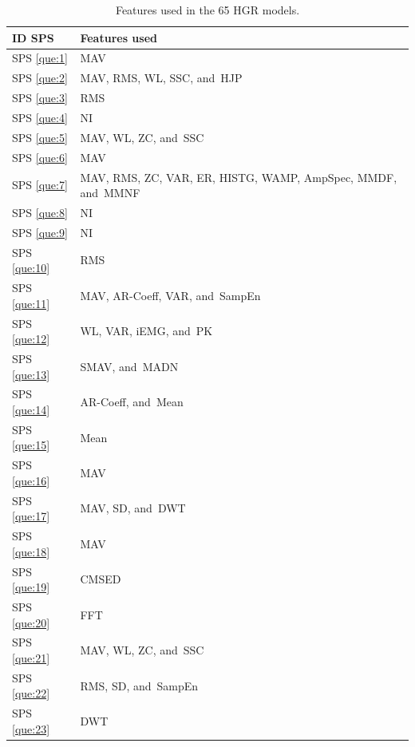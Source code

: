 \documentclass[sensors,review,accept,moreauthors,pdftex]{Definitions/mdpi}
\begin{document}
\begin{table}[H]
\centering
	\caption{ Features used in the 65 HGR models.} \label{tab:10}
\begin{tabular}{m{33pt}m{370pt}}
	\toprule
	\textbf{ID SPS}&\textbf{Features used}\\
	\midrule
%	
%	
%	
%	
%	
%	
	
	SPS \ref{que:1}	&	MAV	\\	
	SPS \ref{que:2}	&	MAV, RMS, WL, SSC, and~HJP	\\	
	SPS \ref{que:3}	&	RMS	\\	
	SPS \ref{que:4}	&	NI	\\	
	SPS \ref{que:5}	&	MAV, WL, ZC, and~SSC	\\	
	SPS \ref{que:6}	&	MAV	\\	
	SPS \ref{que:7}	&	MAV, RMS, ZC, VAR, ER, HISTG, WAMP, AmpSpec, MMDF, and~MMNF	\\	
	SPS \ref{que:8}	&	NI	\\	
	SPS \ref{que:9}	&	NI	\\	
	SPS \ref{que:10}	&	RMS	\\	
	SPS \ref{que:11}	&	MAV, AR-Coeff, VAR, and~SampEn	\\	
	SPS \ref{que:12}	&	WL, VAR, iEMG, and~PK	\\	
	SPS \ref{que:13}	&	SMAV, and~MADN	\\	
	SPS \ref{que:14}	&	AR-Coeff, and~Mean	\\	
	SPS \ref{que:15}	&	Mean	\\	
	SPS \ref{que:16}	&	MAV	\\	
	SPS \ref{que:17}	&	MAV, SD, and~DWT	\\	
	SPS \ref{que:18}	&	MAV	\\	
	SPS \ref{que:19}	&	CMSED	\\	
	SPS \ref{que:20}	&	FFT	\\	
	SPS \ref{que:21}	&	MAV, WL, ZC, and~SSC	\\	
	SPS \ref{que:22}	&	RMS, SD, and~SampEn	\\	
	SPS \ref{que:23}	&	DWT	\\	
	
	\bottomrule
		
	\end{tabular}
	
\end{table}
\end{document}

